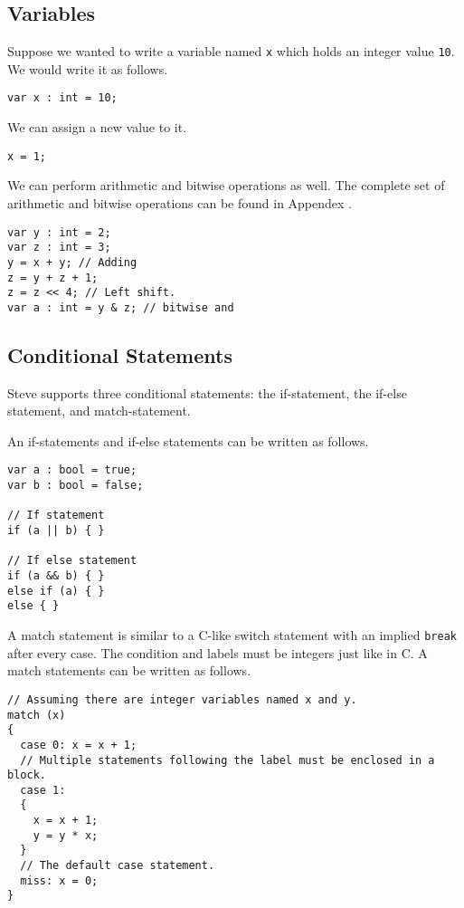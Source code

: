 \subsection{Variables} \label{variable_tut}

Suppose we wanted to write a variable named \texttt{x} which holds an integer value \texttt{10}. We would write it as follows.

\begin{lstlisting}
var x : int = 10;
\end{lstlisting}

We can assign a new value to it.

\begin{lstlisting}
x = 1;
\end{lstlisting}

We can perform arithmetic and bitwise operations as well. The complete set of arithmetic and bitwise operations can be found in Appendex \cite{ap:a}.

\begin{lstlisting}
var y : int = 2;
var z : int = 3;
y = x + y; // Adding
z = y + z + 1; 
z = z << 4; // Left shift.
var a : int = y & z; // bitwise and
\end{lstlisting}

\subsection{Conditional Statements} \label{condition_tut}

Steve supports three conditional statements: the if-statement, the if-else statement, and match-statement.

An if-statements and if-else statements can be written as follows.

\begin{lstlisting}
var a : bool = true;
var b : bool = false;

// If statement
if (a || b) { }

// If else statement
if (a && b) { }
else if (a) { }
else { }
\end{lstlisting}

A match statement is similar to a C-like switch statement with an implied \texttt{break} after every case. The condition and labels must be integers just like in C. A match statements can be written as follows.

\begin{lstlisting}
// Assuming there are integer variables named x and y.
match (x)
{
  case 0: x = x + 1;
  // Multiple statements following the label must be enclosed in a block.
  case 1:
  {
    x = x + 1;
    y = y * x;
  }
  // The default case statement.
  miss: x = 0;
}
\end{lstlisting}


